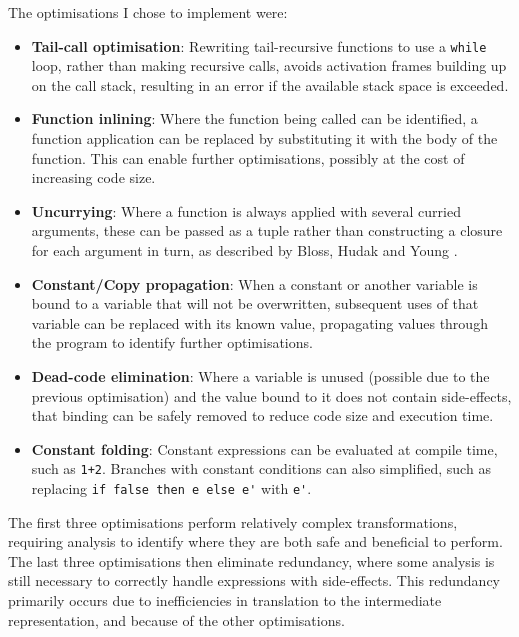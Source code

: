The optimisations I chose to implement were:
\begin{itemize}
\item \textbf{Tail-call optimisation}: Rewriting tail-recursive functions to use a \verb|while| loop, rather than making recursive calls, avoids activation frames building up on the call stack, resulting in an error if the available stack space is exceeded.

\item \textbf{Function inlining}: Where the function being called can be identified, a function application can be replaced by substituting it with the body of the function. This can enable further optimisations, possibly at the cost of increasing code size.

\item \textbf{Uncurrying}: Where a function is always applied with several curried arguments, these can be passed as a tuple rather than constructing a closure for each argument in turn, as described by Bloss, Hudak and Young \cite{uncurry}. 

\item \textbf{Constant/Copy propagation}: When a constant or another variable is bound to a variable that will not be overwritten, subsequent uses of that variable can be replaced with its known value, propagating values through the program to identify further optimisations.%

\item \textbf{Dead-code elimination}: Where a variable is unused (possible due to the previous optimisation) and the value bound to it does not contain side-effects, that binding can be safely removed to reduce code size and execution time.

\item \textbf{Constant folding}: Constant expressions can be evaluated at compile time, such as \verb|1+2|. Branches with constant conditions can also simplified, such as  replacing \verb|if false then e else e'| with \verb|e'|.

\end{itemize}

The first three optimisations perform relatively complex transformations, requiring analysis to identify where they are both safe and beneficial to perform. The last three optimisations then eliminate redundancy, where some analysis is still necessary to correctly handle expressions with side-effects. This redundancy primarily occurs due to inefficiencies in translation to the intermediate representation, and because of the other optimisations.

